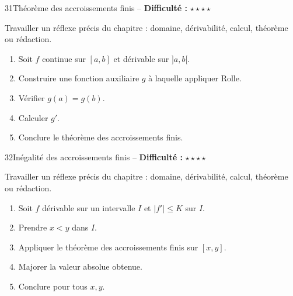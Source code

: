 \documentclass[11pt,a4paper]{article}
\newcommand{\etoiles}[1]{\textbf{Difficulté :} #1}
\begin{document}
\begin{exobox}{31}{Théorème des accroissements finis -- \etoiles{$\star\star\star\star$}}

\begin{objectifbox}
Travailler un réflexe précis du chapitre : domaine, dérivabilité, calcul, théorème ou rédaction.
\end{objectifbox}

\begin{enumerate}

\item Soit $f$ continue sur $[a,b]$ et dérivable sur $]a,b[$.

\item Construire une fonction auxiliaire $g$ à laquelle appliquer Rolle.

\item Vérifier $g(a)=g(b)$.

\item Calculer $g'$.

\item Conclure le théorème des accroissements finis.

\end{enumerate}

\end{exobox}


\begin{exobox}{32}{Inégalité des accroissements finis -- \etoiles{$\star\star\star\star$}}

\begin{objectifbox}
Travailler un réflexe précis du chapitre : domaine, dérivabilité, calcul, théorème ou rédaction.
\end{objectifbox}

\begin{enumerate}

\item Soit $f$ dérivable sur un intervalle $I$ et $|f'|\le K$ sur $I$.

\item Prendre $x<y$ dans $I$.

\item Appliquer le théorème des accroissements finis sur $[x,y]$.

\item Majorer la valeur absolue obtenue.

\item Conclure pour tous $x,y$.

\end{enumerate}

\end{exobox}
\end{document}
